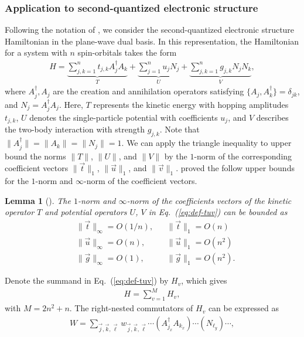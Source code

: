\documentclass[11pt]{article}
\newtheorem{lemma}{Lemma}
\newcommand{\eq}[1]{(\ref{eq:#1})}
\begin{document}
\subsubsection{Application to second-quantized electronic structure}
Following the notation of \citet{childs2021theory}, we consider the second-quantized electronic structure Hamiltonian in the plane-wave dual basis. In this representation, the Hamiltonian for a system with $n$ spin-orbitals takes the form
\begin{align}
    \label{eq:def-tuv}
    H = \underbrace{\sum_{j,k=1}^n t_{j,k} A_j^\dagger A_k}_{T} 
      + \underbrace{\sum_{j=1}^n u_j N_j}_{U} 
      + \underbrace{\sum_{j,k=1}^n g_{j,k} N_j N_k}_{V},
\end{align}
where $A_j^\dagger, A_j$ are the creation and annihilation operators satisfying $\{A_j, A_k^\dagger\} = \delta_{jk}$, and $N_j = A_j^\dagger A_j$. Here, $T$ represents the kinetic energy with hopping amplitudes $t_{j,k}$, $U$ denotes the single-particle potential with coefficients $u_j$, and $V$ describes the two-body interaction with strength $g_{j,k}$.
Note that $\|A_j^{\dagger}\|=\|A_k\|=\|N_j\|=1$. We can apply the triangle inequality to upper bound the norms $\|T\|$, $\|U\|$, and $\|V\|$ by the $1$-norm of the corresponding coefficient vectors $\|\vec{t}\|_1$, $\|\vec{u}\|_1$, and $\|\vec{v}\|_1$. \citet{childs2021theory} proved the follow upper bounds for the $1$-norm and $\infty$-norm of the coefficient vectors. 
\begin{lemma}[{\cite[Proposition F.2]{childs2021theory}}]
\label{lem:norm-tuv}
    The $1$-norm and $\infty$-norm of the coefficients vectors of the kinetic operator $T$ and potential operators $U$, $V$ in Eq.~\eq{def-tuv} can be bounded as \begin{align*}
        &\|\vec{t}\|_{\infty} = O(1/n), && \|\vec{t}\|_1 = O(n) \\
        &\|\vec{u}\|_{\infty} = O(n), && \|\vec{u}\|_1 = O(n^2) \\
        &\|\vec{g}\|_{\infty} = O(1), && \|\vec{g}\|_1  = O(n^2). 
    \end{align*}
\end{lemma}
Denote the summand in Eq.~\eq{def-tuv} by $H_{v}$, which gives \begin{align*}
    H = \sum_{v = 1}^{M} H_{v},
\end{align*}
with $M = 2n^2 +n$.
The right-nested commutators of $H_v$ can be expressed as \begin{align*}
    W = \sum_{\vec{j}, \vec{k},\vec{\ell}}w_{\vec{j}, \vec{k},\vec{\ell}}\cdots (A_{j_x}^{\dagger} A_{k_x}) \cdots (N_{\ell_y})\cdots,
\end{align*}
\end{document}
